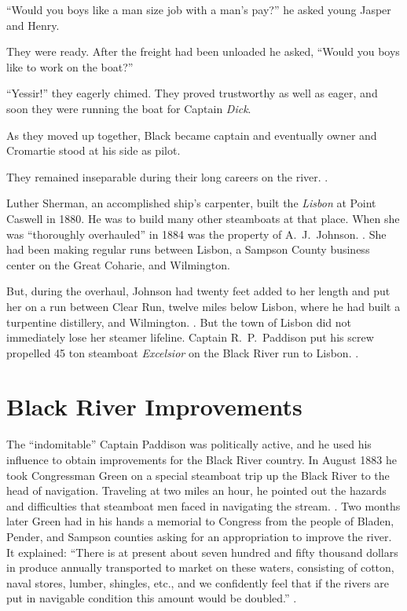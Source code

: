 \documentclass[11pt, a5paper, openright]{book}
\newcommand{\steamer}[1]{\textit{#1}\index{#1,~steamer}}
\begin{document}
``Would you boys like a man size job with a man's pay?'' he asked
young Jasper and Henry.\par

They were ready.  After the freight had been unloaded he asked,
``Would you boys like to work on the boat?''\par

``Yessir!'' they eagerly chimed.  They proved trustworthy as well as
eager, and soon they were running the boat for Captain
\textit{Dick}.\par

As they moved up together, Black
became captain and eventually owner and Cromartie
stood at his side as pilot.\par

They remained inseparable during their long careers on the river.
\citep{blackj}.\par

Luther Sherman, an accomplished ship's
carpenter, built the \steamer{Lisbon} at Point Caswell in 1880.  He
was to build many other steamboats at that place.  When she was
``thoroughly overhauled'' in 1884 was the property of
A.~J.\ Johnson.  \citep[7-4-1884]{ws}.  She had
been making regular runs between Lisbon, a Sampson County business
center on the Great Coharie, and Wilmington.\par

But, during the overhaul, Johnson had twenty feet added to her length
and put her on a run between Clear Run, twelve miles below Lisbon,
where he had built a turpentine distillery, and Wilmington.
\citep[7-14-1884]{ws}.  But the town of Lisbon did not immediately
lose her steamer lifeline.  Captain R.~P.\
Paddison put his screw propelled 45 ton
steamboat \steamer{Excelsior} on the Black River run to Lisbon.
\citep[2-27-1885]{ws}.\par

\section{Black River Improvements}

The ``indomitable'' Captain Paddison
was politically active, and he used his influence to obtain
improvements for the Black River country.  In August 1883 he took
Congressman Green on a special steamboat trip up the Black River to
the head of navigation.  Traveling at two miles an hour, he pointed
out the hazards and difficulties that steamboat men faced in
navigating the stream.  \citep[8-24-1883]{ws}.  Two months later Green
had in his hands a memorial to Congress from the people of Bladen,
Pender, and Sampson counties asking for an appropriation to improve
the river.  It explained: ``There is at present about seven hundred
and fifty thousand dollars in produce annually transported to market
on these waters, consisting of cotton, naval stores, lumber, shingles,
etc., and we confidently feel that if the rivers are put in navigable
condition this amount would be doubled.''  \citep[11-2-1883]{ws}.\par
\end{document}
